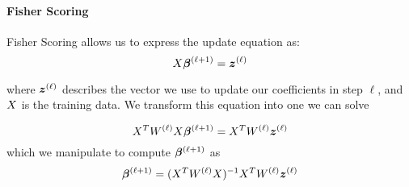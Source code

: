 \paragraph{Fisher Scoring}
Fisher Scoring allows us to express the update equation as:
\begin{equation}
	\xdata\coefficients{\step+1} = \updatevector{\step}
\end{equation}

where $\updatevector{\step}$ describes the vector we use to update our coefficients in step $\ell$, and $X$ is the training data. We transform this equation into one we can solve

\begin{equation}
	\transpose{\xdata}\wmatrix{\step}\xdata\coefficients{\step+1} = \transpose{\xdata} \wmatrix{\step} \updatevector{\step}
\end{equation}
which we manipulate to compute $\coefficients{\step+1}$ as
\begin{equation}
	\coefficients{\step+1} = \inversemat{(\transpose{\xdata}\wmatrix{\step}\xdata)}\transpose{\xdata} \wmatrix{\step}\updatevector{\step}
\end{equation}

